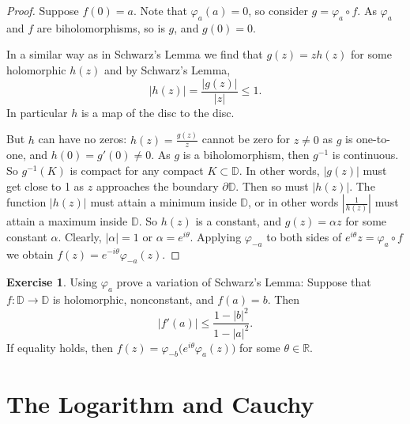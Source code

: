 \documentclass[12pt,openany]{book}
\newcommand{\sabs}[1]{\lvert {#1} \rvert}
\newcommand{\abs}[1]{\left\lvert {#1} \right\rvert}
\newcommand{\R}{{\mathbb{R}}}
\newcommand{\D}{{\mathbb{D}}}
\theoremstyle{plain}
\theoremstyle{remark}
\theoremstyle{definition}
\newenvironment{exbox}{%
    \def\FrameCommand{\vrule width 1pt \relax\hspace {10pt}}%
    \MakeFramed {\advance \hsize -\width \FrameRestore }%
}{%
    \endMakeFramed
}
\theoremstyle{exercise}
\newtheorem{exercise}{Exercise}[section]
\theoremstyle{example}
\begin{document}
\begin{proof}
Suppose $f(0) = a$.  Note that $\varphi_a(a) = 0$, so
consider
$g = \varphi_a \circ f$.  As $\varphi_a$ and $f$ are biholomorphisms, so is
$g$, and $g(0) = 0$.

In a similar way as in Schwarz's Lemma we find that $g(z) = z h(z)$ for some
holomorphic $h(z)$ and by Schwarz's Lemma,
\begin{equation*}
\sabs{h(z)} = \frac{\sabs{g(z)}}{\sabs{z}} \leq 1 .
\end{equation*}
In particular $h$ is a map of the disc to the disc.

But $h$ can have no zeros:
$h(z) = \frac{g(z)}{z}$ cannot be zero for $z \not= 0$ as $g$ is one-to-one,
and $h(0) = g'(0) \not= 0$.  As $g$ is a biholomorphism, then $g^{-1}$ is
continuous. So $g^{-1}(K)$ is compact for any compact $K \subset \D$.
In other words, $\sabs{g(z)}$ must get close to 1 as $z$
approaches the boundary $\partial \D$.  Then so must $\sabs{h(z)}$.
The function
$\sabs{h(z)}$ must attain a minimum inside $\D$, or in other
words $\abs{\frac{1}{h(z)}}$ must attain a maximum inside $\D$.  So $h(z)$
is a constant, and $g(z) = \alpha z$ for some constant $\alpha$.
Clearly, 
$\sabs{\alpha} = 1$ or $\alpha = e^{i\theta}$.  Applying
$\varphi_{-a}$ to both sides of $e^{i\theta} z = \varphi_a \circ f$
we obtain $f(z) = e^{-i\theta} \varphi_{-a}(z)$.
\end{proof}

\begin{exbox}
\begin{exercise}
Using $\varphi_a$ prove a variation of Schwarz's Lemma:  Suppose
that $f \colon \D \to \D$ is holomorphic, nonconstant, and $f(a) = b$.
Then
\begin{equation*}
\sabs{f'(a)} \leq
\frac{1-\sabs{b}^2}{1-\sabs{a}^2} .
\end{equation*}
If equality holds, then $f(z) = \varphi_{-b}\bigl( e^{i\theta} \varphi_a(z)
\bigr)$ for some $\theta \in \R$.
\end{exercise}
\end{exbox}


\chapter{The Logarithm and Cauchy} \label{ch:log}
\end{document}
